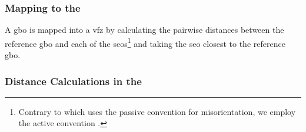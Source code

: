 \documentclass[final,twocolumn,12pt]{elsarticle}
\begin{document}
%	
%	
	\subsubsection{Mapping  to the }
	\label{sec:methods:framework:proj}
	
	A \gls{gbo} is mapped into a \gls{vfz} by calculating the pairwise distances between the reference \gls{gbo} and each of the \glspl{seo}\footnote{Contrary to \citet{francisGeodesicOctonionMetric2019} which uses the passive convention for misorientation, we employ the active convention \cite{bairdFiveDegreeofFreedomPropertyUnderReview}. } and taking the \gls{seo} closest to the reference \gls{gbo}.
	
	\subsubsection{Distance Calculations in the }
	\label{sec:methods:framework:vfz-dist}
	
\end{document}
